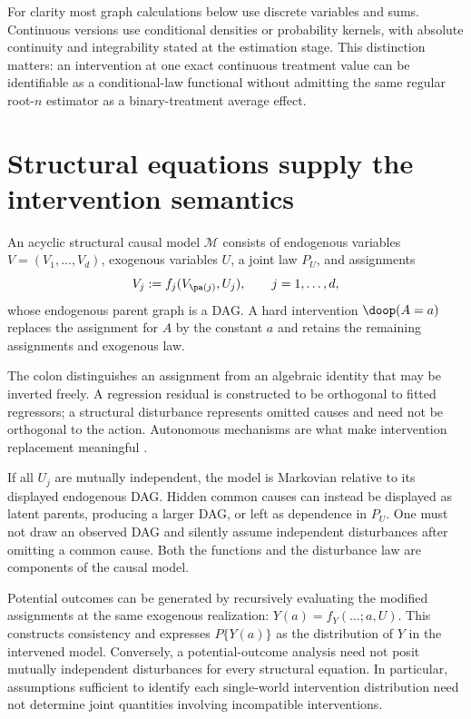 For clarity most graph calculations below use discrete variables and sums.
Continuous versions use conditional densities or probability kernels, with
absolute continuity and integrability stated at the estimation stage. This
distinction matters: an intervention at one exact continuous treatment value
can be identifiable as a conditional-law functional without admitting the
same regular root-$n$ estimator as a binary-treatment average effect.

\section{Structural equations supply the intervention semantics}
\begin{definition}
An acyclic structural causal model $\mathcal M$ consists of endogenous
variables $V=(V_1,\ldots,V_d)$, exogenous variables $U$, a joint law $P_U$,
and assignments
\[
 V_j:=f_j(V_{\pa(j)},U_j),\qquad j=1,\ldots,d,
\]
whose endogenous parent graph is a DAG. A hard intervention $\doop(A=a)$
replaces the assignment for $A$ by the constant $a$ and retains the remaining
assignments and exogenous law.
\end{definition}
The colon distinguishes an assignment from an algebraic identity that may
be inverted freely. A regression residual is constructed to be orthogonal
to fitted regressors; a structural disturbance represents omitted causes
and need not be orthogonal to the action. Autonomous mechanisms are what
make intervention replacement meaningful \citep[Sections 3.1--3.2]{pearl2009}.

If all $U_j$ are mutually independent, the model is Markovian relative to
its displayed endogenous DAG. Hidden common causes can instead be displayed
as latent parents, producing a larger DAG, or left as dependence in $P_U$.
One must not draw an observed DAG and silently assume independent disturbances
after omitting a common cause. Both the functions and the disturbance law
are components of the causal model.

Potential outcomes can be generated by recursively evaluating the modified
assignments at the same exogenous realization: $Y(a)=f_Y(\ldots;a,U)$.
This constructs consistency and expresses $P\{Y(a)\}$ as the distribution
of $Y$ in the intervened model. Conversely, a potential-outcome analysis
need not posit mutually independent disturbances for every structural
equation. In particular, assumptions sufficient to identify each
single-world intervention distribution need not determine joint quantities
involving incompatible interventions.

